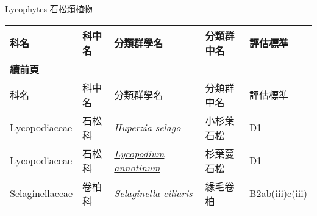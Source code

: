 \noindent\normalfont\selectfont Lycophytes 石松類植物
\footnotesize\selectfont
        {\def\arraystretch{1.5}\tabcolsep=2pt
        \begin{longtable}{p{2.5cm}p{2.5cm}p{4.5cm}p{2.5cm}p{3cm}}
        \toprule
          科名 & 科中名 & 分類群學名 & 分類群中名 & 評估標準 \\
        \midrule 
        \endfirsthead

        {{\bfseries 續前頁 }} \\
        科名 & 科中名 & 分類群學名 & 分類群中名 & 評估標準 \\
        \midrule
        \endhead
                Lycopodiaceae & 石松科 & \href{http://www.theplantlist.org/tpl1.1/search?q=Huperzia+selago}{\textit{Huperzia selago} } & 小杉葉石松 & D1 \index{Huperzia@\textit{Huperzia}!selago@\textit{selago}}  \index{小杉葉石松} \\
    Lycopodiaceae & 石松科 & \href{http://www.theplantlist.org/tpl1.1/search?q=Lycopodium+annotinum}{\textit{Lycopodium annotinum} } & 杉葉蔓石松 & D1 \index{Lycopodium@\textit{Lycopodium}!annotinum@\textit{annotinum}}  \index{杉葉蔓石松} \\
    Selaginellaceae & 卷柏科 & \href{http://www.theplantlist.org/tpl1.1/search?q=Selaginella+ciliaris}{\textit{Selaginella ciliaris} } & 緣毛卷柏 & B2ab(iii)c(iii) \index{Selaginella@\textit{Selaginella}!ciliaris@\textit{ciliaris}}  \index{緣毛卷柏} \\
    \bottomrule
        \end{longtable}
        }
    